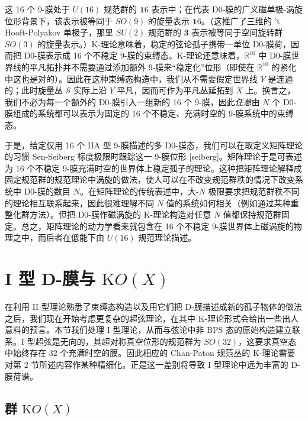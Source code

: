 \documentclass[11pt,a4paper]{ctexart}
\newcommand{\SrcRange}[2]{\marginpar{\raggedright\footnotesize 原文 p.#1}}
\begin{document}
这 16 个 9-膜处于 \(U(16)\) 规范群的 \({\mathbf16}\) 表示中；在代表 D0-膜的广义磁单极-涡旋位形背景下，该表示被等同于 \(SO(9)\) 的旋量表示 \({\mathbf16}\)。（这推广了三维的 't Hooft-Polyakov 单极子，那里 \(SU(2)\) 规范群的 \({\mathbf3}\) 表示被等同于空间旋转群 \(SO(3)\) 的旋量表示。）K-理论意味着，稳定的弦论孤子携带一单位 D0-膜荷，因而把 D0-膜表示成 16 个不稳定 9-膜的束缚态。K-理论还意味着，\({\mathbb{R}}^{10}\) 中 D0-膜世界线的平凡拓扑并不需要通过添加额外 9-膜来``稳定化''位形（即使在 \({\mathbb{R}}^{10}\) 的紧化中这也是对的）。因此在这种束缚态构造中，我们从不需要假定世界线 \(Y\) 是连通的；此时旋量丛 \({\mathcal S}\) 实际上沿 \(Y\) 平凡，因而可作为平凡丛延拓到 \(X\) 上。换言之，我们不必为每一个额外的 D0-膜引入一组新的 16 个 9-膜，因此\emph{任意}由 \(N\) 个 D0-膜组成的系统都可以表示为固定的 16 个不稳定、充满时空的 9-膜系统中的束缚态。

于是，给定仅用 16 个 IIA 型 9-膜描述的多 D0-膜态，我们可以在取定义矩阵理论的习惯 Sen-Seiberg 标度极限时跟踪这一 9-膜位形 [seiberg]。矩阵理论于是可表述为 16 个不稳定 9-膜充满时空的世界体上稳定孤子的理论。这种把矩阵理论解释成固定规范群的规范理论中涡旋的做法，使人可以在不改变规范群秩的情况下改变系统中 D0-膜的数目 \(N\)。在矩阵理论的传统表述中，大-\(N\) 极限要求把规范群秩不同的理论相互联系起来，因此很难理解不同 \(N\) 值的系统如何相关（例如通过某种重整化群方法）。但把 D0-膜作磁涡旋的 K-理论构造对任意 \(N\) 值都保持规范群固定。总之，矩阵理论的动力学看来就包含在 16 个不稳定 9-膜世界体上磁涡旋的物理之中，而后者在低能下由 \(U(16)\) 规范理论描述。

\SrcRange{52}{52}
\section{\texorpdfstring{I 型 D-膜与 \({\mathrm KO}(X)\)}{I 型 D-膜与 \{\textbackslash mathrm KO\}(X)}}\label{i-ux578b-d-ux819cux4e0e-mathrm-kox}

在利用 II 型理论熟悉了束缚态构造以及用它们把 D-膜描述成新的孤子物体的做法之后，我们现在开始考虑更复杂的超弦理论，在其中 K-理论形式会给出一些出人意料的预言。本节我们处理 I 型理论，从而与弦论中非 BPS 态的原始构造建立联系。I 型超弦是无向的，其超对称真空位形的规范群为 \(SO(32)\)，这要求真空态中始终存在 32 个充满时空的膜。因此相应的 Chan-Paton 规范丛的 K-理论需要对第 2 节所述内容作某种精细化。正是这一差别将导致 I 型理论中远为丰富的 D-膜荷谱。

\SrcRange{53}{53}
\subsection{\texorpdfstring{群 \({\mathrm KO}(X)\)}{群 \{\textbackslash mathrm KO\}(X)}}\label{ux7fa4-mathrm-kox}
\end{document}
